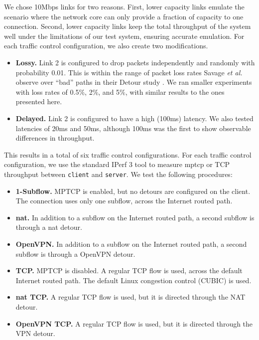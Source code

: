 \documentclass{cwru}
\begin{document}
We chose 10Mbps links for two reasons. First, lower capacity links emulate the
scenario where the network core can only provide a fraction of capacity to one
connection. Second, lower capacity links keep the total throughput of the system
well under the limitations of our test system, ensuring accurate emulation. For
each traffic control configuration, we also create two modifications.

\begin{itemize}
\item \textbf{Lossy.} Link 2 is configured to drop packets independently and
  randomly with probability 0.01. This is within the range of packet loss rates
  Savage \textit{et al.} observe over ``bad'' paths in their Detour study
  \cite{detour}. We ran smaller experiments with loss rates of 0.5\%, 2\%, and
  5\%, with similar results to the ones presented here.
\item \textbf{Delayed.} Link 2 is configured to have a high (100ms) latency. We
  also tested latencies of 20ms and 50ms, although 100ms was the first to show
  observable differences in throughput.
\end{itemize}

This results in a total of six traffic control configurations. For each traffic
control configuration, we use the standard IPerf 3 tool to measure \ac{mptcp} or
TCP throughput between \texttt{client} and \texttt{server}. We test the
following procedures:

\begin{itemize}
\item \textbf{1-Subflow.} MPTCP is enabled, but no detours are configured on the
  client. The connection uses only one subflow, across the Internet routed path.
\item \textbf{\ac{nat}.} In addition to a subflow on the Internet routed path, a
  second subflow is through a \ac{nat} detour.
\item \textbf{OpenVPN.} In addition to a subflow on the Internet routed path, a
  second subflow is through a OpenVPN detour.
\item \textbf{TCP.} MPTCP is disabled. A regular TCP flow is used, across the
  default Internet routed path. The default Linux congestion control (CUBIC) is
  used.
\item \textbf{\ac{nat} TCP.} A regular TCP flow is used, but it is directed
  through the NAT detour.
\item \textbf{OpenVPN TCP.} A regular TCP flow is used, but it is directed
  through the VPN detour.
\end{itemize}
\end{document}
